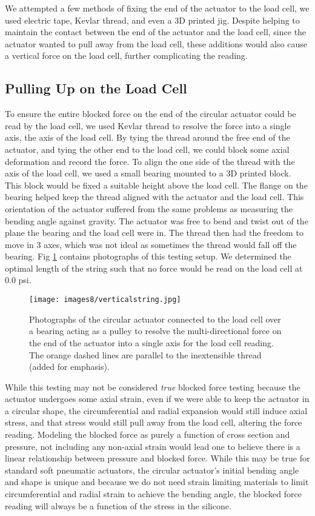 We attempted a few methods of fixing the end of the actuator to the load cell, we used electric tape, Kevlar thread, and even a 3D printed jig. Despite helping to maintain the contact between the end of the actuator and the load cell, since the actuator wanted to pull away from the load cell, these additions would also cause a vertical force on the load cell, further complicating the reading. 

\subsection{Pulling Up on the Load Cell}

To ensure the entire blocked force on the end of the circular actuator could be read by the load cell, we used Kevlar thread to resolve the force into a single axis, the axis of the load cell. By tying the thread around the free end of the actuator, and tying the other end to the load cell, we could block some axial deformation and record the force. To align the one side of the thread with the axis of the load cell, we used a small bearing mounted to a 3D printed block. This block would be fixed a suitable height above the load cell. The flange on the bearing helped keep the thread aligned with the actuator and the load cell. This orientation of the actuator suffered from the same problems as measuring the bending angle against gravity. The actuator was free to bend and twist out of the plane the bearing and the load cell were in. The thread then had the freedom to move in 3 axes, which was not ideal as sometimes the thread would fall off the bearing. Fig \ref{fig:verticalstring} contains photographs of this testing setup. We determined the optimal length of the string such that no force would be read on the load cell at 0.0 psi. 

\begin{figure}[ht]
    \centering
     \texttt{[image: images8/verticalstring.jpg]}
    \caption{Photographs of the circular actuator connected to the load cell over a bearing acting as a pulley to resolve the multi-directional force on the end of the actuator into a single axis for the load cell reading. The orange dashed lines are parallel to the inextensible thread (added for emphasis).}
    \label{fig:verticalstring}
\end{figure}

While this testing may not be considered \emph{true} blocked force testing because the actuator undergoes some axial strain, even if we were able to keep the actuator in a circular shape, the circumferential and radial expansion would still induce axial stress, and that stress would still pull away from the load cell, altering the force reading. Modeling the blocked force as purely a function of cross section and pressure, not including any non-axial strain would lead one to believe there is a linear relationship between pressure and blocked force. While this may be true for standard soft pneumatic actuators, the circular actuator's initial bending angle and shape is unique and because we do not need strain limiting materials to limit circumferential and radial strain to achieve the bending angle, the blocked force reading will always be a function of the stress in the silicone. 

